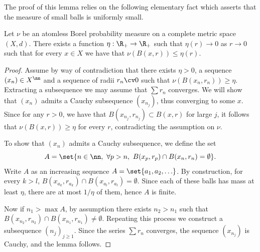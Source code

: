 The proof of this lemma relies on the following elementary fact which asserts that the measure of small balls is uniformly small.

\begin{lemm}\label{lem:uniform}
Let $\nu$ be an atomless Borel probability measure on a complete metric space $(X,d)$. There exists a function $\eta : \R_+ \to \R_+$ such that $\eta(r)\to 0$ as $r\to 0$ such that for every $x\in X$ we have that $\nu(B(x,r))\leq \eta(r)$.
\end{lemm}

\goodbreak
\begin{proof}
Assume by way of contradiction that there exists $\eta>0$, a sequence $(x_n)\in X^\nn$ and a sequence of radii $r_n\cv 0$ such that $\nu(B(x_n, r_n))\geq \eta$. Extracting a subsequence we may assume that $\sum r_n$ converges. We will show that $(x_n)$ admits a Cauchy subsequence $(x_{n_j})$, thus converging to some $x$. Since for any $r>0$, we have that $B(x_{n_j}, r_{n_j}) \subset B(x, r)$ for large $j$, it follows that $\nu (B(x,r))\geq \eta$ for every $r$, contradicting the assumption on $\nu$.

To show that $(x_n)$ admits a Cauchy subsequence, we define the set
\[
A = \set{n\in \nn,\ \forall p>n, \ B(x_p, r_p) \cap B(x_n, r_n) = \emptyset}.
\]
Write $A$ as an increasing sequence $A = \set{a_1, a_2, \ldots}$. By construction, for every $k>l$, $B(x_{a_k}, r_{a_k}) \cap B(x_{a_l}, r_{a_l}) = \emptyset$. Since each of these balls has mass at least $ \eta$, there are at most $1/\eta$ of them, hence $A$ is finite.

Now if $n_1> \max A$, by assumption there exists $n_2>n_1$ such that $B(x_{n_2}, r_{n_2})\cap B(x_{n_1}, r_{n_1})\neq \emptyset$. Repeating this process we construct a subsequence $(n_j)_{j\geq 1}$. Since the series $\sum r_n$ converges, the sequence $(x_{n_j})$ is Cauchy, and the lemma follows.
\end{proof}

